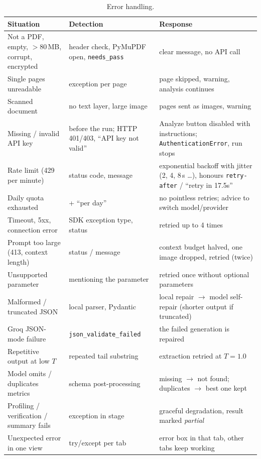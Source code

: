 \documentclass[11pt,a4paper]{article}
\newcommand{\code}[1]{\texttt{\small #1}}
\begin{document}
\begin{table}[H]
\centering\small
\begin{tabularx}{\linewidth}{@{}>{\raggedright\arraybackslash}p{4.1cm}>{\raggedright\arraybackslash}p{3.6cm}X@{}}
\toprule
\textbf{Situation} & \textbf{Detection} & \textbf{Response}\\\midrule
Not a PDF, empty, $>$80\,MB, corrupt, encrypted & header check, PyMuPDF open, \code{needs\_pass} & clear message, no API call\\
Single pages unreadable & exception per page & page skipped, warning, analysis continues\\
Scanned document & no text layer, large image & pages sent as images, warning\\
Missing / invalid API key & before the run; HTTP 401/403, ``API key not valid'' & Analyze button disabled with instructions; \code{AuthenticationError}, run stops\\
Rate limit (429 per minute) & status code, message & exponential backoff with jitter (2, 4, 8\,s \ldots), honours \code{retry-after} / ``retry in 17.5s''\\
Daily quota exhausted & 429 + ``per day'' & no pointless retries; advice to switch model/provider\\
Timeout, 5xx, connection error & SDK exception type, status & retried up to 4 times\\
Prompt too large (413, context length) & status / message & context budget halved, one image dropped, retried (twice)\\
Unsupported parameter & 400 mentioning the parameter & retried once without optional parameters\\
Malformed / truncated JSON & local parser, Pydantic & local repair $\rightarrow$ model self-repair (shorter output if truncated)\\
Groq JSON-mode failure & 400 \code{json\_validate\_failed} & the failed generation is repaired\\
Repetitive output at low $T$ & repeated tail substring & extraction retried at $T=1.0$\\
Model omits / duplicates metrics & schema post-processing & missing $\rightarrow$ not found; duplicates $\rightarrow$ best one kept\\
Profiling / verification / summary fails & exception in stage & graceful degradation, result marked \emph{partial}\\
Unexpected error in one view & try/except per tab & error box in that tab, other tabs keep working\\
\bottomrule
\end{tabularx}
\caption{Error handling.}
\end{table}
\end{document}
